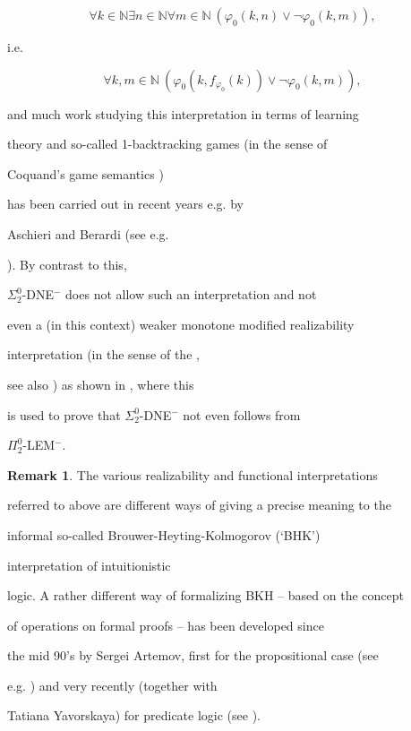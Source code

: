 \documentclass[1p]{elsarticle}
\newcommand{\NN}{\ensuremath{\mathbb{N}}}
\theoremstyle{plain}
\theoremstyle{definition}
\newtheorem{rmk}[thm]{Remark}
\theoremstyle{remark}
\theoremstyle{definition}
\begin{document}
\[ \forall k\in\NN\exists n \in\NN\forall m\in\NN 

\ (\varphi_0(k,n)\vee\neg\varphi_0(k,m)),\]

i.e. 

\[ \forall k,m\in\NN 

\ (\varphi_0(k,f_{\varphi_0}(k))\vee\neg\varphi_0(k,m)),  \] 

and much work studying this interpretation in terms of learning 

theory and so-called 1-backtracking games (in the sense of 

Coquand's game semantics \cite{Coquand,Berardi/Coquand/Hayashi}) 

has been carried out in recent years e.g. by 

Aschieri and Berardi (see e.g. 

\cite{Aschieri/Berardi,Aschieri1,Aschieri2}). By contrast to this, 

$\Sigma^0_2$-DNE$^-$ does not allow such an interpretation and not 

even a (in this context) weaker monotone modified realizability 

interpretation (in the sense of the \cite{Kohlenbach(relative)}, 

see also \cite{Kohlenbach(book)}) as shown in \cite{Akama}, where this 

is used to prove that $\Sigma^0_2$-DNE$^-$ not even follows from 

$\Pi^0_2$-LEM$^-$. 

\begin{rmk} The various realizability and functional interpretations 

referred to above are different ways of giving a precise meaning to the 

informal so-called Brouwer-Heyting-Kolmogorov (`BHK') 

interpretation of intuitionistic 

logic. A rather different way of formalizing BKH -- based on the concept 

of operations on formal proofs -- has been developed since 

the mid 90's by Sergei Artemov, first for the propositional case (see 

e.g. \cite{Artemov}) and very recently (together with 

Tatiana Yavorskaya) for predicate logic (see \cite{Artemov11}).

\end{rmk}
\end{document}
